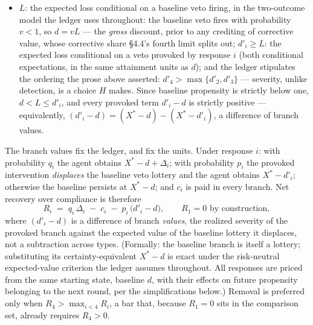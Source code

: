 \documentclass[11pt]{article}
\theoremstyle{definition}
\begin{document}
\begin{itemize}[leftmargin=1.5em]
    \item $L$: the expected loss conditional on a baseline veto firing, in the two-outcome model the ledger uses throughout: the baseline veto fires with probability $v < 1$, so $d = vL$ --- the \emph{gross} discount, prior to any crediting of corrective value, whose corrective share \S4.4's fourth limit splits out; $d'_i \geq L$: the expected loss conditional on a veto provoked by response $i$ (both conditional expectations, in the same attainment units as $d$); and the ledger stipulates the ordering the prose above asserted: $d'_4 > \max\{d'_2, d'_3\}$ --- severity, unlike detection, is a choice $H$ makes. Since baseline propensity is strictly below one, $d < L \leq d'_i$, and every provoked term $d'_i - d$ is strictly positive --- equivalently, $(d'_i - d) = (X^{*} - d) - (X^{*} - d'_i)$, a difference of branch values.
\end{itemize}

The branch values fix the ledger, and fix the units. Under response $i$: with probability $q_i$ the agent obtains $X^{*} - d + \Delta_i$; with probability $p_i$ the provoked intervention \emph{displaces} the baseline veto lottery and the agent obtains $X^{*} - d'_i$; otherwise the baseline persists at $X^{*} - d$; and $c_i$ is paid in every branch. Net recovery over compliance is therefore
\[
R_i \;=\; q_i\,\Delta_i \;-\; c_i \;-\; p_i\,\bigl(d'_i - d\bigr), \qquad R_1 = 0 \text{ by construction},
\]
where $(d'_i - d)$ is a difference of branch \emph{values}, the realized severity of the provoked branch against the expected value of the baseline lottery it displaces, not a subtraction across types. (Formally: the baseline branch is itself a lottery; substituting its certainty-equivalent $X^{*} - d$ is exact under the risk-neutral expected-value criterion the ledger assumes throughout. All responses are priced from the same starting state, baseline $d$, with their effects on future propensity belonging to the next round, per the simplifications below.) Removal is preferred only when $R_4 > \max_{i<4} R_i$, a bar that, because $R_1 = 0$ sits in the comparison set, already requires $R_4 > 0$.
\end{document}
